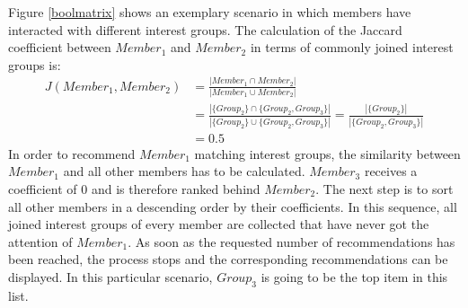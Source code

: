 \documentclass[12pt,numbers=noenddot,parskip,bibliography=totocnumbered,listof=totocnumbered,draft]{scrreprt}
\begin{document}
Figure \ref{boolmatrix} shows an exemplary scenario in which members have interacted with different interest groups. The calculation of the Jaccard coefficient between $\mathit{Member_1}$ and $\mathit{Member_2}$ in terms of commonly joined interest groups is:
\begin{align*}
J(\mathit{Member_1}, \mathit{Member_2}) &= \frac{|\mathit{Member_1} \cap \mathit{Member_2}|}{|\mathit{Member_1} \cup \mathit{Member_2}|} \\ &= \frac{|\{\mathit{Group_2}\} \cap \{\mathit{Group_2, Group_3}\}|}{|\{\mathit{Group_2}\} \cup \{\mathit{Group_2, Group_3}\}|} = \frac{|\{\mathit{Group_2}\}|}{|\{\mathit{Group_2, Group_3}\}|} \\ &= 0.5
\end{align*}
In order to recommend $\mathit{Member_1}$ matching interest groups, the similarity between $\mathit{Member_1}$ and all other members has to be calculated. $\mathit{Member_3}$ receives a coefficient of $0$ and is therefore ranked behind $\mathit{Member_2}$. The next step is to sort all other members in a descending order by their coefficients. In this sequence, all joined interest groups of every member are collected that have never got the attention of $\mathit{Member_1}$. As soon as the requested number of recommendations has been reached, the process stops and the corresponding recommendations can be displayed. In this particular scenario, $\mathit{Group_3}$ is going to be the top item in this list.
\end{document}
